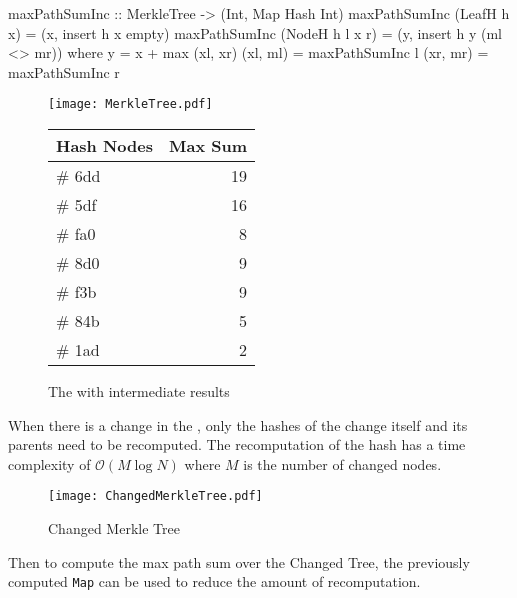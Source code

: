 \begin{haskell}
maxPathSumInc :: MerkleTree -> (Int, Map Hash Int)    
maxPathSumInc (LeafH h x)     = (x, insert h x empty)
maxPathSumInc (NodeH h l x r) = (y, insert h y (ml <> mr))  
  where
    y = x + max (xl, xr)
    (xl, ml) = maxPathSumInc l
    (xr, mr) = maxPathSumInc r
\end{haskell}
\vspace{15pt}
\begin{figure}[H]
    \begin{minipage}[c]{0.55\textwidth}
        \centering
        \texttt{[image: MerkleTree.pdf]}
    \end{minipage}
    \hspace{0.1\textwidth}
    \begin{minipage}[c]{0.35\textwidth}
        \centering
        \begin{tabular}{|l|r|}
            \hline
            \textbf{Hash Nodes} & \textbf{Max Sum} \\
            \hline
            \# 6dd & 19 \\
            \hline
            \# 5df & 16 \\
            \hline
            \# fa0 & 8 \\
            \hline
            \# 8d0 & 9 \\
            \hline
            \# f3b & 9 \\
            \hline
            \# 84b & 5 \\
            \hline
            \# 1ad & 2 \\
            \hline
        \end{tabular}
    \end{minipage}
    \caption{The  with intermediate results}    
\end{figure}

When there is a change in the , only the hashes of the change itself and its parents need to be recomputed. The recomputation of the hash has a time complexity of $\mathcal{O}(M \log{N})$ where $M$ is the number of changed nodes.

\begin{figure}[H]
    \centering
    \texttt{[image: ChangedMerkleTree.pdf]}
    \caption{Changed Merkle Tree}
\end{figure}

Then to compute the max path sum over the Changed Tree, the previously computed \texttt{Map} can be used to reduce the amount of recomputation.  

